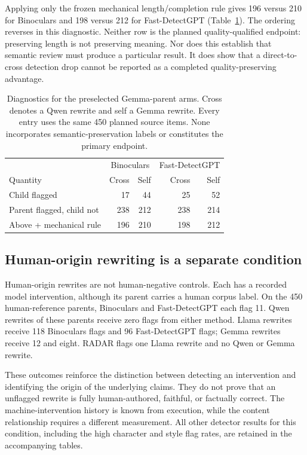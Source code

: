 Applying only the frozen mechanical length/completion rule gives 196 versus 210 for Binoculars and 198 versus 212 for Fast-DetectGPT (Table~\ref{tab:primarydiagnostic}). The ordering reverses in this diagnostic. Neither row is the planned quality-qualified endpoint: preserving length is not preserving meaning. Nor does this establish that semantic review must produce a particular result. It does show that a direct-to-cross detection drop cannot be reported as a completed quality-preserving advantage.

\begin{table}[t]
\centering
\caption{Diagnostics for the preselected Gemma-parent arms. Cross denotes a Qwen rewrite and self a Gemma rewrite. Every entry uses the same 450 planned source items. None incorporates semantic-preservation labels or constitutes the primary endpoint.}
\label{tab:primarydiagnostic}
\small
\begin{tabular}{lrrrr}
\toprule
 & \multicolumn{2}{c}{Binoculars} & \multicolumn{2}{c}{Fast-DetectGPT}\\
Quantity & Cross & Self & Cross & Self\\
\midrule
Child flagged & 17 & 44 & 25 & 52\\
Parent flagged, child not & 238 & 212 & 238 & 214\\
Above + mechanical rule & 196 & 210 & 198 & 212\\
\bottomrule
\end{tabular}
\end{table}

\subsection{Human-origin rewriting is a separate condition}
Human-origin rewrites are not human-negative controls. Each has a recorded model intervention, although its parent carries a human corpus label. On the 450 human-reference parents, Binoculars and Fast-DetectGPT each flag 11. Qwen rewrites of these parents receive zero flags from either method. Llama rewrites receive 118 Binoculars flags and 96 Fast-DetectGPT flags; Gemma rewrites receive 12 and eight. RADAR flags one Llama rewrite and no Qwen or Gemma rewrite.

These outcomes reinforce the distinction between detecting an intervention and identifying the origin of the underlying claims. They do not prove that an unflagged rewrite is fully human-authored, faithful, or factually correct. The machine-intervention history is known from execution, while the content relationship requires a different measurement. All other detector results for this condition, including the high character and style flag rates, are retained in the accompanying tables.

